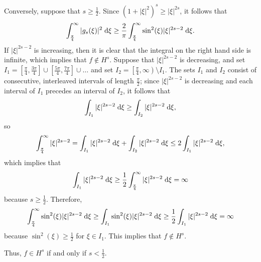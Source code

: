 \documentclass{homework}
\begin{document}
	Conversely, suppose that $s \ge \frac{1}{2}$. Since $(1+|\xi|^2)^s \ge |\xi|^{2s}$, it follows that
	\begin{equation*}
		\int_\frac{\pi}{4}^\infty |g_s(\xi)|^2 \;\text{d}\xi \ge \frac{2}{\pi}\int_\frac{\pi}{4}^\infty \sin^2(\xi)|\xi|^{2s-2}\;\text{d} \xi.
	\end{equation*}
	If $|\xi|^{2s-2}$ is increasing, then it is clear that the integral on the right hand side is infinite, which implies that $f \notin H^s$. Suppose that $|\xi|^{2s-2}$ is decreasing, and set $I_1 = \left[\frac{\pi}{4}, \frac{3\pi}{4}\right] \cup \left[\frac{5\pi}{4}, \frac{7\pi}{4}\right] \cup \dots$ and set $I_2 = \left[\frac{\pi}{4}, \infty\right) \setminus I_1$. The sets $I_1$ and $I_2$ consist of consecutive, interleaved intervals of length $\frac{\pi}{2}$; since $|\xi|^{2s-2}$ is decreasing and each interval of $I_1$ precedes an interval of $I_2$, it follows that
	\begin{equation*}
		\int_{I_1} |\xi|^{2s-2}\;\text{d}\xi \ge \int_{I_2}|\xi|^{2s-2}\;\text{d}\xi,
	\end{equation*}
	so
	\begin{equation*}
		\int_\frac{\pi}{4}^\infty |\xi|^{2s-2} = \int_{I_1}|\xi|^{2s-2}\;\text{d}\xi + \int_{I_2}|\xi|^{2s-2}\;\text{d}\xi \le 2\int_{I_1} |\xi|^{2s-2}\;\text{d}\xi,
	\end{equation*}
	which implies that
	\begin{equation*}
		\int_{I_1}|\xi|^{2s-2}\;\text{d}\xi \ge \frac{1}{2}\int_{\frac{\pi}{4}}^\infty |\xi|^{2s-2}\;\text{d}\xi = \infty
	\end{equation*}
	because $s \ge \frac{1}{2}$. Therefore,
	\begin{equation*}
		\int_\frac{\pi}{4}^\infty \sin^2(\xi)|\xi|^{2s-2} \;\text{d}\xi \ge \int_{I_1}\sin^2(\xi)|\xi|^{2s-2}\;\text{d}\xi \ge \frac{1}{2}\int_{I_1}|\xi|^{2s-2}\;\text{d}\xi = \infty
	\end{equation*}
	because $\sin^2(\xi) \ge \frac{1}{2}$ for $\xi \in I_1$. This implies that $f \notin H^s$.
	
	Thus, $f\in H^s$ if and only if $s < \frac{1}{2}$.
	
	\question
	
\end{document}
